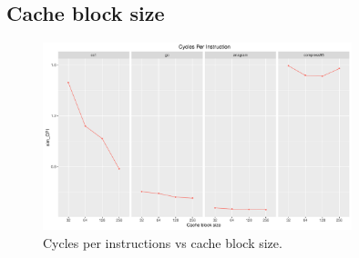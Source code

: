 \documentclass[10pt]{scrartcl}
\begin{document}
\FloatBarrier

\subsection{Cache block size}

\begin{figure}[h]
  \centering
  \includegraphics[width=0.8\textwidth]{Plots/plot_CacheBS_sim_CPI}
  \caption{Cycles per instructions vs cache block size.}\label{fig:cache-bs_sim_cpi}
\end{figure}
\end{document}
